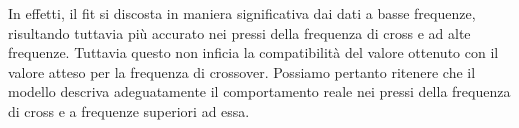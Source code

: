 \documentclass[../Relazione_circuiti]{subfiles}
\begin{document}
  In effetti, il fit si discosta in maniera significativa dai dati a basse frequenze, risultando tuttavia più
  accurato nei pressi della frequenza di cross e ad alte frequenze.
Tuttavia questo non inficia la compatibilità del valore ottenuto con il valore atteso per la frequenza di crossover.
  Possiamo pertanto ritenere che il modello descriva adeguatamente il comportamento reale nei pressi della frequenza
  di cross e a frequenze superiori ad essa.
\end{document}
